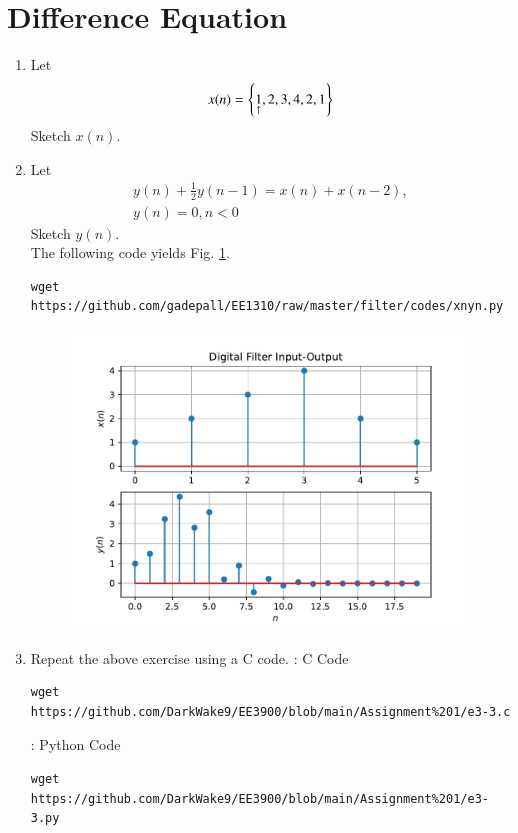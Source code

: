 \documentclass[journal,12pt,twocolumn]{IEEEtran}
\renewcommand\thesection{\arabic{section}}
\begin{document}
	\section{Difference Equation}
	\begin{enumerate}[label=\thesection.\arabic*,ref=\thesection.\theenumi]
		\item Let
		\begin{equation}
			\label{def:xn}
			x(n) = \left\{\underset{\uparrow}{1},2,3,4,2,1\right\}
		\end{equation}
		Sketch $x(n)$.
		\item Let
		\begin{multline}
			\label{eq:iir_filter}
			y(n) + \frac{1}{2}y(n-1) = x(n) + x(n-2), 
			\\
			y(n) = 0, n < 0
		\end{multline}
		Sketch $y(n)$.
		\\
		\solution The following code yields Fig. \ref{fig:xnyn}.
		\begin{lstlisting}
wget https://github.com/gadepall/EE1310/raw/master/filter/codes/xnyn.py
		\end{lstlisting}
		\begin{figure}[!ht]
			\begin{center}
				\includegraphics[width=\columnwidth]{./figs/xnyn}
			\end{center}
			\label{fig:xnyn}	
		\end{figure}
		
		\item Repeat the above exercise using a C code.
		\solution: C Code
		\begin{lstlisting}
wget https://github.com/DarkWake9/EE3900/blob/main/Assignment%201/e3-3.c
		\end{lstlisting}
		\solution: Python Code
\begin{lstlisting}
wget https://github.com/DarkWake9/EE3900/blob/main/Assignment%201/e3-3.py
\end{lstlisting}		
	\end{enumerate}
\end{document}
